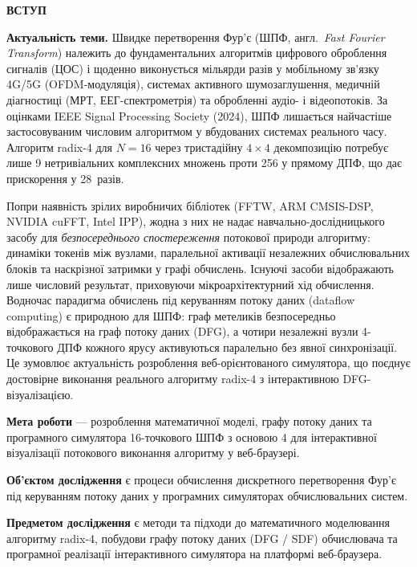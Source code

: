 {\centering\bfseries ВСТУП\par}
\vspace{1em}

\textbf{Актуальність теми.}
Швидке перетворення Фур'є (ШПФ, англ.\ \textit{Fast Fourier Transform}) належить
до фундаментальних алгоритмів цифрового оброблення сигналів (ЦОС) і щоденно
виконується мільярди разів у мобільному зв'язку 4G/5G (OFDM-модуляція), системах
активного шумозаглушення, медичній діагностиці (МРТ, ЕЕГ-спектрометрія) та
обробленні аудіо- і відеопотоків. За оцінками IEEE Signal Processing Society
(2024), ШПФ лишається найчастіше застосовуваним числовим алгоритмом у вбудованих
системах реального часу. Алгоритм radix-4 для $N = 16$ через тристадійну
$4 \times 4$ декомпозицію потребує лише 9 нетривіальних комплексних множень
проти 256 у прямому ДПФ, що дає прискорення у 28~разів.

Попри наявність зрілих виробничих бібліотек (FFTW, ARM CMSIS-DSP, NVIDIA cuFFT,
Intel IPP), жодна з них не надає навчально-дослідницького засобу для
\emph{безпосереднього спостереження} потокової природи алгоритму: динаміки
токенів між вузлами, паралельної активації незалежних обчислювальних блоків та
наскрізної затримки у графі обчислень. Існуючі засоби відображають лише
числовий результат, приховуючи мікроархітектурний хід обчислення. Водночас
парадигма обчислень під керуванням потоку даних (dataflow computing) є природною
для ШПФ: граф метеликів безпосередньо відображається на граф потоку даних
(DFG), а чотири незалежні вузли 4-точкового ДПФ кожного ярусу активуються
паралельно без явної синхронізації. Це зумовлює актуальність розроблення
веб-орієнтованого симулятора, що поєднує достовірне виконання реального
алгоритму radix-4 з інтерактивною DFG-візуалізацією.

\textbf{Мета роботи} --- розроблення математичної моделі, графу потоку даних та
програмного симулятора 16-точкового ШПФ з основою 4 для інтерактивної
візуалізації потокового виконання алгоритму у веб-браузері.

\textbf{Об'єктом дослідження} є процеси обчислення дискретного перетворення
Фур'є під керуванням потоку даних у програмних симуляторах обчислювальних систем.

\textbf{Предметом дослідження} є методи та підходи до математичного моделювання
алгоритму radix-4, побудови графу потоку даних (DFG / SDF) обчислювача та
програмної реалізації інтерактивного симулятора на платформі веб-браузера.

